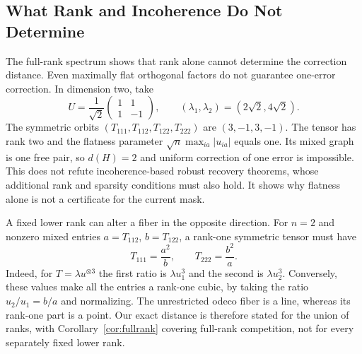 \subsection{What Rank and Incoherence Do Not Determine}
The full-rank spectrum shows that rank alone cannot determine the correction distance. Even maximally flat orthogonal factors do not guarantee one-error correction. In dimension two, take
\[
 U=\frac{1}{\sqrt2}\begin{pmatrix}1&1\\1&-1\end{pmatrix},
 \qquad (\lambda_1,\lambda_2)=(2\sqrt2,4\sqrt2).
\]
The symmetric orbits $(T_{111},T_{112},T_{122},T_{222})$ are $(3,-1,3,-1)$. The tensor has rank two and the flatness parameter $\sqrt n\max_{ia}|u_{ia}|$ equals one. Its mixed graph is one free pair, so $d(H)=2$ and uniform correction of one error is impossible. This does not refute incoherence-based robust recovery theorems, whose additional rank and sparsity conditions must also hold. It shows why flatness alone is not a certificate for the current mask.

A fixed lower rank can alter a fiber in the opposite direction. For $n=2$ and nonzero mixed entries $a=T_{112}$, $b=T_{122}$, a rank-one symmetric tensor must have
\begin{equation}\label{eq:rank-one}
 T_{111}=\frac{a^2}{b},\qquad T_{222}=\frac{b^2}{a}.
\end{equation}
Indeed, for $T=\lambda u^{\otimes3}$ the first ratio is $\lambda u_1^3$ and the second is $\lambda u_2^3$. Conversely, these values make all the entries a rank-one cubic, by taking the ratio $u_2/u_1=b/a$ and normalizing. The unrestricted odeco fiber is a line, whereas its rank-one part is a point. Our exact distance is therefore stated for the union of ranks, with Corollary~\ref{cor:fullrank} covering full-rank competition, not for every separately fixed lower rank.
